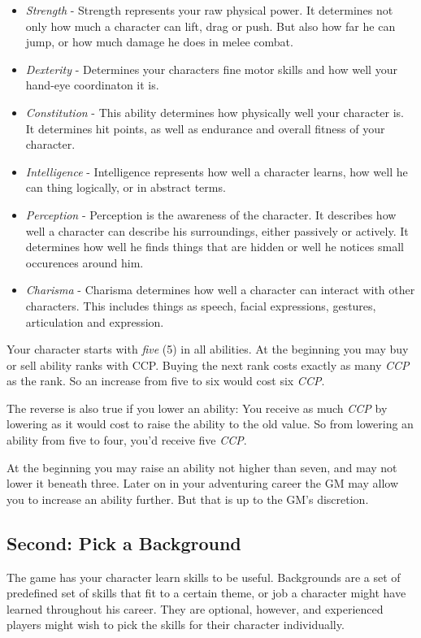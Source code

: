 \begin{itemize}
\item \emph{Strength} - Strength represents your raw physical power. It
  determines not only how much a character can lift, drag or push. But also how
  far he can jump, or how much damage he does in melee combat.
\item \emph{Dexterity} - Determines your characters fine motor skills and how
  well your hand-eye coordinaton it is.
\item \emph{Constitution} - This ability determines how physically well your
  character is. It determines hit points, as well as endurance and overall
  fitness of your character.
\item \emph{Intelligence} - Intelligence represents how well a character learns,
  how well he can thing logically, or in abstract terms.
\item \emph{Perception} - Perception is the awareness of the character. It
  describes how well a character can describe his surroundings, either passively
  or actively. It determines how well he finds things that are hidden or
  well he notices small occurences around him.
\item \emph{Charisma} - Charisma determines how well a character can interact
  with other characters. This includes things as speech, facial expressions,
  gestures, articulation and expression.
\end{itemize}

Your character starts with \emph{five} (5) in all abilities. At the beginning
you may buy or sell ability ranks with CCP. Buying the next rank costs exactly
as many \emph{CCP} as the rank. So an increase from five to six would cost six
\emph{CCP}.

The reverse is also true if you lower an ability: You receive as much \emph{CCP}
by lowering as it would cost to raise the ability to the old value. So from
lowering an ability from five to four, you'd receive five \emph{CCP}.

At the beginning you may raise an ability not higher than seven, and may not
lower it beneath three. Later on in your adventuring career the GM may allow you
to increase an ability further. But that is up to the GM's discretion.

\subsection{Second: Pick a Background}

The game has your character learn skills to be useful. Backgrounds are a set of
predefined set of skills that fit to a certain theme, or job a character might
have learned throughout his career. They are optional, however, and experienced
players might wish to pick the skills for their character individually.

